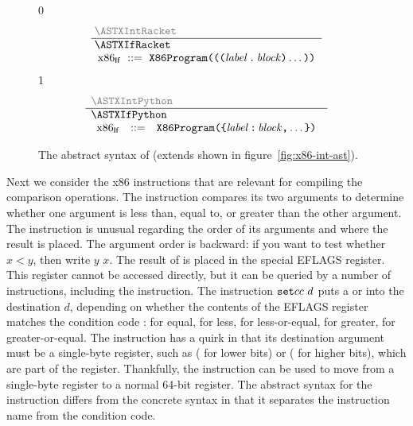 \documentclass[7x10]{TimesAPriori_MIT}%
\newcommand{\gray}[1]{{\color{gray} #1}}
\def\racketEd{0}
\def\pythonEd{1}
\def\edition{1}
\newcommand{\pythonColor}[0]{}
\numberwithin{theorem}{chapter}
\numberwithin{definition}{chapter}
\numberwithin{equation}{chapter}
\begin{document}
\begin{figure}[tp]
\begin{tcolorbox}[colback=white]
\small    
{\if\edition\racketEd    
\[\arraycolsep=3pt
\begin{array}{l}
  \gray{\ASTXIntRacket} \\ \hline
  \ASTXIfRacket \\
\begin{array}{lcl}
\LangXIfM{} &::= & \XPROGRAM{\itm{info}}{\LP\LP\itm{label} \,\key{.}\, \Block \RP\ldots\RP}
\end{array}
\end{array}
\]
\fi}
%
{\if\edition\pythonEd\pythonColor
\[
\begin{array}{l}
  \gray{\ASTXIntPython} \\ \hline
  \ASTXIfPython \\
\begin{array}{lcl}
\LangXIfM{} &::= & \XPROGRAM{\itm{info}}{\LC\itm{label} \,\key{:}\, \Block \key{,} \ldots \RC }
\end{array}
\end{array}
\]
\fi}
\end{tcolorbox}
\caption{The abstract syntax of \LangXIf{} (extends \LangXInt{} shown in figure~\ref{fig:x86-int-ast}).}
\label{fig:x86-1}
\end{figure}

Next we consider the x86 instructions that are relevant for compiling
the comparison operations. The  instruction compares its two
arguments to determine whether one argument is less than, equal to, or
greater than the other argument. The  instruction is unusual
regarding the order of its arguments and where the result is
placed. The argument order is backward: if you want to test whether
$x < y$, then write  $y$\code{,} $x$. The result of
 is placed in the special EFLAGS register. This register
cannot be accessed directly, but it can be queried by a number of
instructions, including the  instruction. The instruction
$\texttt{set}cc~d$ puts a  or  into the destination $d$,
depending on whether the contents of the EFLAGS register matches the
condition code :  for equal,  for less, 
for less-or-equal,  for greater,  for greater-or-equal.
The  instruction has a quirk in that its destination argument
must be a single-byte register, such as  ( for lower bits) or
 ( for higher bits), which are part of the 
register.  Thankfully, the  instruction can be used to
move from a single-byte register to a normal 64-bit register.  The
abstract syntax for the  instruction differs from the
concrete syntax in that it separates the instruction name from the
condition code.
\end{document}
